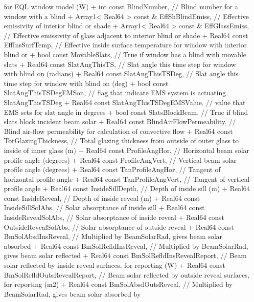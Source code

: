 \begin{DoxyCode}
       for EQL window model (W)
+           int const BlindNumber, // Blind number for a window with a blind
+           Array1< Real64 > const & EffShBlindEmiss, // Effective emissivity of interior blind or shade
+           Array1< Real64 > const & EffGlassEmiss, // Effective emissivity of glass adjacent to interior
       blind or shade
+           Real64 const EffInsSurfTemp, // Effective inside surface temperature for window with interior
       blind or
+           bool const MovableSlats, // True if window has a blind with movable slats
+           Real64 const SlatAngThisTS, // Slat angle this time step for window with blind on (radians)
+           Real64 const SlatAngThisTSDeg, // Slat angle this time step for window with blind on (deg)
+           bool const SlatAngThisTSDegEMSon, // flag that indicate EMS system is actuating
       SlatAngThisTSDeg
+           Real64 const SlatAngThisTSDegEMSValue, // value that EMS sets for slat angle in degrees
+           bool const SlatsBlockBeam, // True if blind slats block incident beam solar
+           Real64 const BlindAirFlowPermeability, // Blind air-flow permeability for calculation of
       convective flow
+           Real64 const TotGlazingThickness, // Total glazing thickness from outside of outer glass to
       inside of inner glass (m)
+           Real64 const ProfileAngHor, // Horizontal beam solar profile angle (degrees)
+           Real64 const ProfileAngVert, // Vertical beam solar profile angle (degrees)
+           Real64 const TanProfileAngHor, // Tangent of horizontal profile angle
+           Real64 const TanProfileAngVert, // Tangent of vertical profile angle
+           Real64 const InsideSillDepth, // Depth of inside sill (m)
+           Real64 const InsideReveal, // Depth of inside reveal (m)
+           Real64 const InsideSillSolAbs, // Solar absorptance of inside sill
+           Real64 const InsideRevealSolAbs, // Solar absorptance of inside reveal
+           Real64 const OutsideRevealSolAbs, // Solar absorptance of outside reveal
+           Real64 const BmSolAbsdInsReveal, // Multiplied by BeamSolarRad, gives beam solar absorbed
+           Real64 const BmSolRefldInsReveal, // Multiplied by BeamSolarRad, gives beam solar reflected
+           Real64 const BmSolRefldInsRevealReport, // Beam solar reflected by inside reveal surfaces, for
       reporting (W)
+           Real64 const BmSolRefldOutsRevealReport, // Beam solar reflected by outside reveal surfaces,
       for reporting (m2)
+           Real64 const BmSolAbsdOutsReveal, // Multiplied by BeamSolarRad, gives beam solar absorbed by

\end{DoxyCode}
